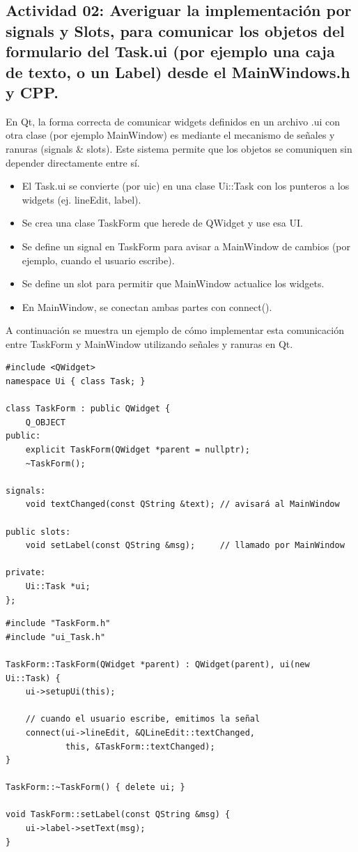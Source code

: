 \subsection{Actividad 02: Averiguar la implementación por signals y Slots, para comunicar los objetos del formulario del Task.ui (por ejemplo una caja de texto, o un Label) desde el MainWindows.h y CPP.}

En Qt, la forma correcta de comunicar widgets definidos en un archivo .ui con otra clase (por ejemplo MainWindow) es mediante el mecanismo de señales y ranuras (signals \& slots). Este sistema permite que los objetos se comuniquen sin depender directamente entre sí.

\begin{itemize}
    \item El Task.ui se convierte (por uic) en una clase Ui::Task con los punteros a los widgets (ej. lineEdit, label).
    \item Se crea una clase TaskForm que herede de QWidget y use esa UI.
    \item Se define un signal en TaskForm para avisar a MainWindow de cambios (por ejemplo, cuando el usuario escribe).
    \item Se define un slot para permitir que MainWindow actualice los widgets.
    \item En MainWindow, se conectan ambas partes con connect().
\end{itemize}

A continuación se muestra un ejemplo de cómo implementar esta comunicación entre TaskForm y MainWindow utilizando señales y ranuras en Qt.

\begin{lstlisting}[style=cpp-style, caption={TaskForm.h}]
#include <QWidget>
namespace Ui { class Task; }

class TaskForm : public QWidget {
    Q_OBJECT
public:
    explicit TaskForm(QWidget *parent = nullptr);
    ~TaskForm();

signals:
    void textChanged(const QString &text); // avisará al MainWindow

public slots:
    void setLabel(const QString &msg);     // llamado por MainWindow

private:
    Ui::Task *ui;
};
\end{lstlisting}

\begin{lstlisting}[style=cpp-style, caption={TaskForm.cpp}]
#include "TaskForm.h"
#include "ui_Task.h"

TaskForm::TaskForm(QWidget *parent) : QWidget(parent), ui(new Ui::Task) {
    ui->setupUi(this);

    // cuando el usuario escribe, emitimos la señal
    connect(ui->lineEdit, &QLineEdit::textChanged,
            this, &TaskForm::textChanged);
}

TaskForm::~TaskForm() { delete ui; }

void TaskForm::setLabel(const QString &msg) {
    ui->label->setText(msg);
}
\end{lstlisting}

